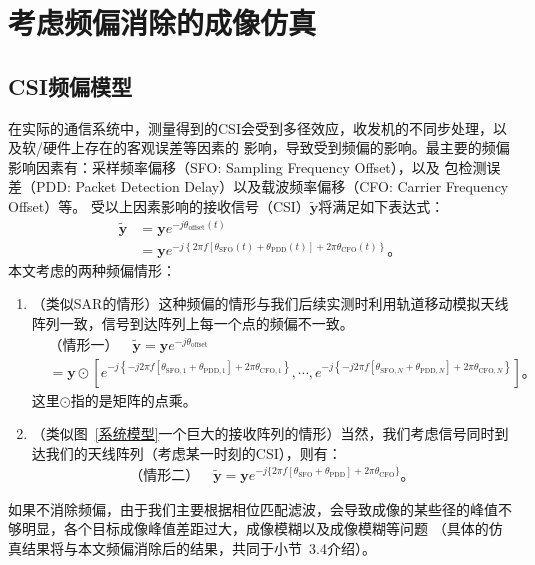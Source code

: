 \section{考虑频偏消除的成像仿真}
\subsection{CSI频偏模型}
在实际的通信系统中，测量得到的CSI会受到多径效应，收发机的不同步处理，以及软/硬件上存在的客观误差等因素的
影响，导致受到频偏的影响。最主要的频偏影响因素有：采样频率偏移（SFO: Sampling Frequency Offset），以及
包检测误差（PDD: Packet Detection Delay）以及载波频率偏移（CFO: Carrier Frequency Offset）等\cite{ma2019wifi}\cite{Precise_PDP_WiFi}。
受以上因素影响的接收信号（CSI）$\tilde{\boldsymbol{y}}$将满足如下表达式\cite{zhang2022practical}：
\begin{align}
  \tilde{\boldsymbol{y}} &= \boldsymbol{y}e^{-j\theta_{\text{offset}}(t)} \nonumber 
  \\ &= \boldsymbol{y}e^{-j \left\{2\pi f[\theta_{\text{SFO}}(t)+\theta_{\text{PDD}}(t)]+2\pi \theta_{\text{CFO}}(t)\right\}}
  \text{。}
\end{align}
本文考虑的两种频偏情形：
\begin{enumerate}
  \item （类似SAR的情形）这种频偏的情形与我们后续实测时利用轨道移动模拟天线阵列一致，信号到达阵列上每一个点的频偏不一致。
  \begin{align}
    & \text{（情形一）}\quad \tilde{\boldsymbol{y}} = \boldsymbol{y}e^{-j\theta_{\text{offset}}} \nonumber \\
    &= \boldsymbol{y} \odot \left[e^{-j\left\{-j2\pi f[\theta_{\text{SFO},1}+\theta_{\text{PDD},1}]+2\pi \theta_{\text{CFO},1}\right\}},\cdots,e^{-j\left\{-j2\pi f[\theta_{\text{SFO},N}+\theta_{\text{PDD},N}]+2\pi \theta_{\text{CFO},N}\right\}}\right]
    \text{。}
    \label{情形一}
  \end{align}
  这里$\odot$指的是矩阵的点乘。
  \item （类似图~\ref{系统模型}一个巨大的接收阵列的情形）当然，我们考虑信号同时到达我们的天线阵列（考虑某一时刻的CSI），则有：
  \begin{align}
    \text{（情形二）}\quad
    \tilde{\boldsymbol{y}} = \boldsymbol{y}e^{-j\{2\pi f[\theta_{\text{SFO}}+\theta_{\text{PDD}}]+2\pi\theta_{\text{CFO}}\}}
    \text{。}
    \label{情形二}
  \end{align}
\end{enumerate}


如果不消除频偏，由于我们主要根据相位匹配滤波，会导致成像的某些径的峰值不够明显，各个目标成像峰值差距过大，成像模糊以及成像模糊等问题
（具体的仿真结果将与本文频偏消除后的结果，共同于小节~3.4介绍）。
